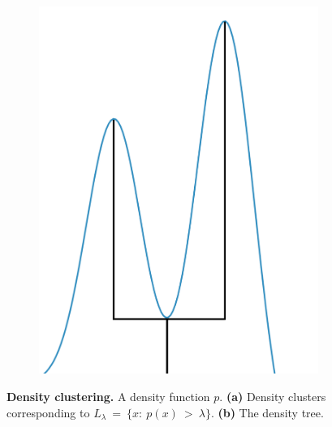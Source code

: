 \begin{figure}[h]
\begin{subfigure}{.5\columnwidth}
    \includegraphics[width=\columnwidth]{main_figures/intro/density_tree.png}
    \caption{}
    \label{fig:tree}
\end{subfigure}
\caption[Density clustering]{\textbf{Density clustering.} A density function $p$. \textbf{(a)} Density clusters corresponding to $L_{\lambda}~=~\{x:~p(x)~>~\lambda\}$. \textbf{(b)} The density tree. }
\label{fig:density_clustering}
\end{figure}


